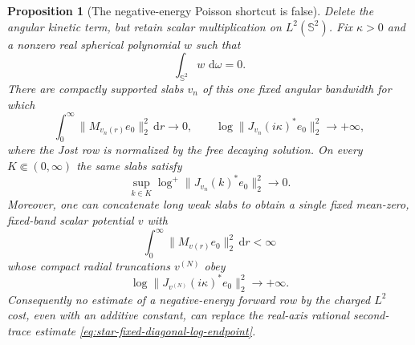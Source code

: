 \documentclass[11pt]{article}
\newcommand{\dd}{\,\mathrm d}
\newtheorem{proposition}[theorem]{Proposition}
\theoremstyle{definition}
\theoremstyle{remark}
\begin{document}
\begin{proposition}[The negative-energy Poisson shortcut is false]
\label{prop:negative-energy-row-no-go}
Delete the angular kinetic term, but retain scalar multiplication on
$L^2(\mathbb S^2)$.  Fix $\kappa>0$ and a nonzero real spherical polynomial
$w$ such that
\begin{equation}
 \int_{\mathbb S^2}w\,\dd\omega=0.
 \label{eq:mean-zero-fixed-band-slab}
\end{equation}
There are compactly supported slabs $v_n$ of this one fixed angular bandwidth
for which
\begin{equation}
 \int_0^\infty\|M_{v_n(r)}e_0\|_2^2\dd r\longrightarrow0,
 \qquad
 \log\|J_{v_n}(i\kappa)^*e_0\|_2^2\longrightarrow+\infty,
 \label{eq:imaginary-row-cost-separation}
\end{equation}
where the Jost row is normalized by the free decaying solution.  On every
$K\Subset(0,\infty)$ the same slabs satisfy
\begin{equation}
 \sup_{k\in K}\log^+\|J_{v_n}(k)^*e_0\|_2^2\longrightarrow0.
 \label{eq:real-row-slab-small}
\end{equation}
Moreover, one can concatenate long weak slabs to obtain a single fixed
mean-zero, fixed-band scalar potential $v$ with
\begin{equation}
 \int_0^\infty\|M_{v(r)}e_0\|_2^2\dd r<\infty
 \label{eq:fixed-slab-train-cost}
\end{equation}
whose compact radial truncations $v^{(N)}$ obey
\begin{equation}
 \log\|J_{v^{(N)}}(i\kappa)^*e_0\|_2^2\longrightarrow+\infty.
 \label{eq:fixed-slab-train-imaginary-growth}
\end{equation}
Consequently no estimate of a negative-energy forward row by the charged
$L^2$ cost, even with an additive constant, can replace the real-axis
rational second-trace estimate
\eqref{eq:star-fixed-diagonal-log-endpoint}.
\end{proposition}
\end{document}
